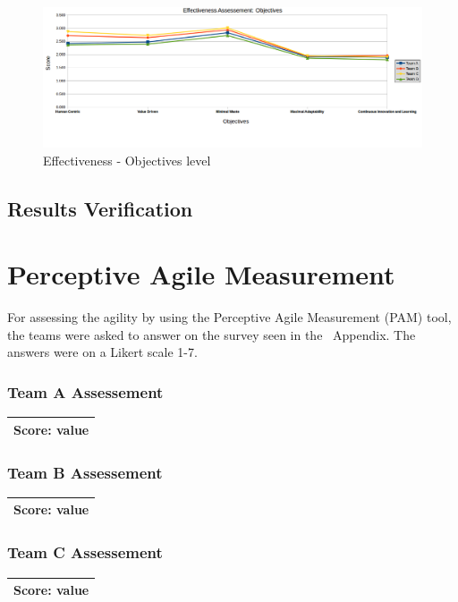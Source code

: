 \begin{figure}[H]
\centerline{\includegraphics[scale=0.55]{include/case_study/fig/team_effectiveness_objectives.png}}
\caption{Effectiveness - Objectives level} 
\label{fig:team_effectiveness_objectives}
\end{figure}


\subsection{Results Verification}

\section{Perceptive Agile Measurement}
For assessing the agility by using the Perceptive Agile Measurement (PAM) tool, the teams were asked to answer on the survey seen in the~ Appendix. The answers were on a Likert scale 1-7.

\subsubsection{Team A Assessement}
\begin{tabular}{| p{3cm} | }
\hline
\textbf{Score:} value \\ \hline
\end{tabular}

\subsubsection{Team B Assessement}
\begin{tabular}{| p{3cm} | }
\hline
\textbf{Score:} value \\ \hline
\end{tabular}

\subsubsection{Team C Assessement}
\begin{tabular}{| p{3cm} | }
\hline
\textbf{Score:} value \\ \hline
\end{tabular}

